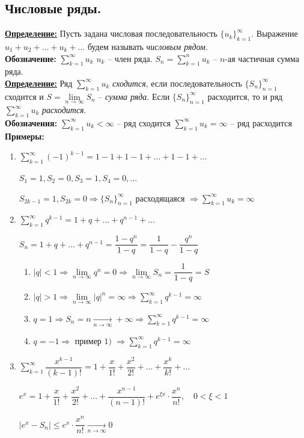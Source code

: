 \documentclass[a4paper,12pt]{article} %
\newcommand{\useries}{\sum\limits_{k=1}^{\infty} u_k}
\newcommand{\useriesl}{\sum\limits_{k=1}^{\infty} u_k < \infty}
\newcommand{\useriese}{\sum\limits_{k=1}^{\infty} u_k = \infty}
\newcommand{\sn}{\sum\limits_{k=1}^{n} u_k}
\begin{document}
\subsection{Числовые ряды.}
\underline{\textbf{Определение:}}
Пусть задана числовая последовательность $\{{u_k}\}_{k=1}^{\infty}$. Выражение $u_1 + u_2 + \ldots + u_k + \ldots$ будем называть \textit{числовым рядом}.\\
\textbf{Обозначение:} $\useries$
$u_k$ -- член ряда.
$S_n = \sn$ -- $n$-ая частичная сумма ряда.\\
\underline{\textbf{Определение:}}
Ряд $\useries$ \textit{сходится}, если последовательность $\{{S_n}\}_{n=1}^{\infty}$ сходится и $S = \lim\limits_{n \to \infty} S_n$ -- \textit{сумма ряда}. Если $\{{S_n}\}_{n=1}^{\infty}$ расходится, то и ряд $\useries$ \textit{расходится}.\\
\textbf{Обозначения:}
$\useriesl$ -- ряд сходится
$\useriese$ -- ряд расходится\\
\textbf{Примеры:}
\begin{enumerate}
	\item $\sum\limits_{k=1}^{\infty} (-1)^{k-1} = 1 - 1 + 1 - 1 + \ldots + 1 - 1 + \ldots$
	
	$S_1 = 1, S_2 = 0, S_3 = 1, S_4 = 0, \ldots$
	
	$S_{2k-1} = 1, S_{2k} = 0 \Rightarrow \{{S_n}\}_{n=1}^{\infty} \text{ расходящаяся } \Rightarrow \useriese$
	\item $\sum\limits_{k=1}^{\infty} q^{k-1} = 1 + q + \ldots + q^{n-1} + \ldots$
	
	$S_n = 1 + q + \ldots + q^{n-1} = \dfrac{1 - q^n}{1 - q} = \dfrac{1}{1 - q} - \dfrac{q^n}{1 - q}$
	
	\begin{enumerate}[label=\asbuk*),ref=\asbuk*]
		\item $|q|<1 \Rightarrow \lim\limits_{n \to \infty} q^n = 0 \Rightarrow \lim\limits_{n \to \infty} S_n = \dfrac{1}{1 - q} = S$
		\item $|q|>1 \Rightarrow \lim\limits_{n \to \infty} |q|^n = \infty \Rightarrow \sum\limits_{k=1}^{\infty} q^{k-1} = \infty$
		\item $q=1 \Rightarrow S_n = n \xrightarrow[n \to \infty]{} +\infty \Rightarrow \sum\limits_{k=1}^{\infty} q^{k-1} = \infty$
		\item $q=-1 \Rightarrow \text{ пример 1) } \Rightarrow \sum\limits_{k=1}^{\infty} q^{k-1} = \infty$
	\end{enumerate}
	\item $\sum\limits_{k=1}^{\infty} \dfrac{x^{k-1}}{(k-1)!} = 1 + \dfrac{x}{1!} + \dfrac{x^2}{2!} + \ldots + \dfrac{x^k}{k!} + \ldots$
	
	$e^x = 1 + \dfrac{x}{1!} + \dfrac{x^2}{2!} + \ldots + \dfrac{x^{n-1}}{(n-1)!} + e^{\xi x} \cdot \dfrac{x^n}{n!}, \hspace{1em} 0<\xi<1$
	
	$|e^x - S_n| \leqslant e^x \cdot \dfrac{x^n}{n!} \xrightarrow[n \to \infty]{} 0$
\end{enumerate}
\end{document}
